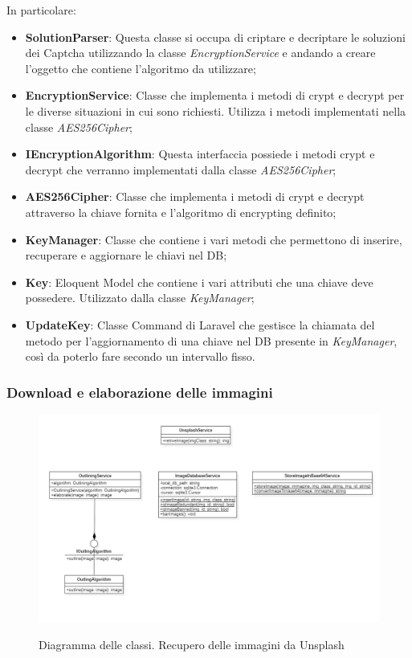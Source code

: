 In particolare:
\begin{itemize}
	\item \textbf{SolutionParser}: Questa classe si occupa di criptare e decriptare le soluzioni dei Captcha utilizzando la classe \textit{EncryptionService} e andando a creare l'oggetto che contiene l'algoritmo da utilizzare;
	\item \textbf{EncryptionService}: Classe che implementa i metodi di crypt e decrypt per le diverse situazioni in cui sono richiesti. Utilizza i metodi implementati nella classe \textit{AES256Cipher};
	\item \textbf{IEncryptionAlgorithm}: Questa interfaccia possiede i metodi crypt e decrypt che verranno implementati dalla classe \textit{AES256Cipher}; 
	\item \textbf{AES256Cipher}: Classe che implementa i metodi di crypt e decrypt attraverso la chiave fornita e l'algoritmo di encrypting definito;
	\item \textbf{KeyManager}: Classe che contiene i vari metodi che permettono di inserire, recuperare e aggiornare le chiavi nel DB;
	\item \textbf{Key}: Eloquent Model che contiene i vari attributi che una chiave deve possedere. Utilizzato dalla classe \textit{KeyManager};
	\item \textbf{UpdateKey}: Classe Command di Laravel che gestisce la chiamata del metodo per l'aggiornamento di una chiave nel DB presente in \textit{KeyManager}, così da poterlo fare secondo un intervallo fisso.
\end{itemize}

\newpage

\subsubsection{Download e elaborazione delle immagini}

\begin{figure}[H]
    \centering
    \includegraphics[scale = 0.6]{img/downloadImg.png}\\
    \caption{Diagramma delle classi. Recupero delle immagini da Unsplash}
\end{figure}

